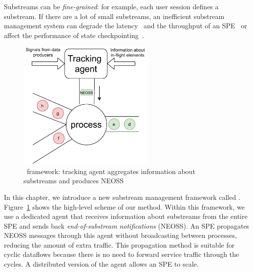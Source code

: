 Substreams can be {\em fine-grained}: for example, each user session defines a substream. If there are a lot of small substreams, an inefficient substream management system can degrade the latency~\cite{DBLP:journals/pvldb/BegoliACHKKMS21} and the throughput of an SPE~\cite{Li:2008:OPN:1453856.1453890} or affect the performance of state checkpointing~\cite{zhang2021research}.

\begin{figure}[t]
  \centering
  \includegraphics[width=0.60\textwidth]{Chapters/Tracker/pics/tracker-scheme.pdf}
  \caption{\tracker\ framework: tracking agent aggregates information about substreams and produces NEOSS}
  \label{tracker_scheme}
\end{figure}

In this chapter, we introduce a new substream management framework called \tracker. Figure~\ref{tracker_scheme} shows the high-level scheme of our method. 
Within this framework, we use a dedicated agent that receives information about substreams from the entire SPE and sends back {\em end-of-substream notifications} (NEOSS). 
An SPE propagates NEOSS messages through this agent without broadcasting between processes, reducing the amount of extra traffic. This propagation method is suitable for cyclic dataflows because there is no need to forward service traffic through the cycles. A distributed version of the agent allows an SPE to scale.


